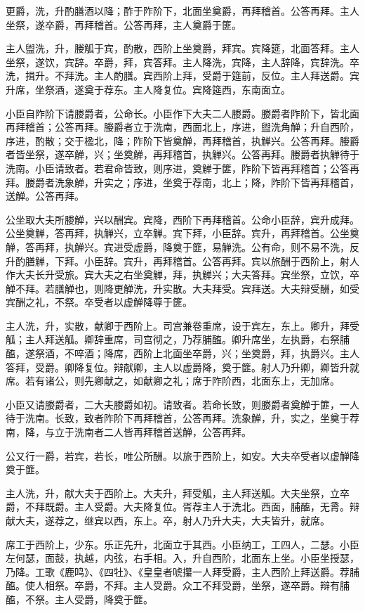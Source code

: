 \documentclass[]{article}
\begin{document}
更爵，洗，升酌膳酒以降；酢于阼阶下，北面坐奠爵，再拜稽首。公答再拜。主人坐祭，遂卒爵，再拜稽首。公答再拜，主人奠爵于篚。

主人盥洗，升，媵觚于宾，酌散，西阶上坐奠爵，拜宾。宾降筵，北面答拜。主人坐祭，遂饮，宾辞。卒爵，拜，宾答拜。主人降洗，宾降，主人辞降，宾辞洗。卒洗，揖升。不拜洗。主人酌膳。宾西阶上拜，受爵于筵前，反位。主人拜送爵。宾升席，坐祭酒，遂奠于荐东。主人降复位。宾降筵西，东南面立。

小臣自阼阶下请媵爵者，公命长。小臣作下大夫二人媵爵。媵爵者阼阶下，皆北面再拜稽首；公答再拜。媵爵者立于洗南，西面北上，序进，盥洗角觯；升自西阶，序进，酌散；交于楹北，降；阼阶下皆奠觯，再拜稽首，执觯兴。公答再拜。媵爵者皆坐祭，遂卒觯，兴；坐奠觯，再拜稽首，执觯兴。公答再拜。媵爵者执觯待于洗南。小臣请致者。若君命皆致，则序进，奠觯于篚，阼阶下皆再拜稽首；公答再拜。媵爵者洗象觯，升实之；序进，坐奠于荐南，北上；降，阼阶下皆再拜稽首，送觯。公答再拜。

公坐取大夫所媵觯，兴以酬宾。宾降，西阶下再拜稽首。公命小臣辞，宾升成拜。公坐奠觯，答再拜，执觯兴，立卒觯。宾下拜，小臣辞。宾升，再拜稽首。公坐奠觯，答再拜，执觯兴。宾进受虚爵，降奠于篚，易觯洗。公有命，则不易不洗，反升酌膳觯，下拜。小臣辞。宾升，再拜稽首。公答再拜。宾以旅酬于西阶上，射人作大夫长升受旅。宾大夫之右坐奠觯，拜，执觯兴；大夫答拜。宾坐祭，立饮，卒觯不拜。若膳觯也，则降更觯洗，升实散。大夫拜受。宾拜送。大夫辩受酬，如受宾酬之礼，不祭。卒受者以虚觯降尊于篚。

主人洗，升，实散，献卿于西阶上。司宫兼卷重席，设于宾左，东上。卿升，拜受觚；主人拜送觚。卿辞重席，司宫彻之，乃荐脯醢。卿升席坐，左执爵，右祭脯醢，遂祭酒，不啐酒；降席，西阶上北面坐卒爵，兴；坐奠爵，拜，执爵兴。主人答拜，受爵。卿降复位。辩献卿，主人以虚爵降，奠于篚。射人乃升卿，卿皆升就席。若有诸公，则先卿献之，如献卿之礼；席于阼阶西，北面东上，无加席。

小臣又请媵爵者，二大夫媵爵如初。请致者。若命长致，则媵爵者奠觯于篚，一人待于洗南。长致，致者阼阶下再拜稽首，公答再拜。洗象觯，升，实之，坐奠于荐南，降，与立于洗南者二人皆再拜稽首送觯，公答再拜。

公又行一爵，若宾，若长，唯公所酬。以旅于西阶上，如安。大夫卒受者以虚觯降奠于篚。

主人洗，升，献大夫于西阶上。大夫升，拜受觚，主人拜送觚。大夫坐祭，立卒爵，不拜既爵。主人受爵。大夫降复位。胥荐主人于洗北。西面，脯醢，无脀。辩献大夫，遂荐之，继宾以西，东上。卒，射人乃升大夫，大夫皆升，就席。

席工于西阶上，少东。乐正先升，北面立于其西。小臣纳工，工四人，二瑟。小臣左何瑟，面鼓，执越，内弦，右手相。入，升自西阶，北面东上坐。小臣坐授瑟，乃降。工歌《鹿鸣》、《四牡》、《皇皇者唬攥一人拜受爵，主人西阶上拜送爵。荐脯醢。使人相祭。卒爵，不拜。主人受爵。众工不拜受爵，坐祭，遂卒爵。辩有脯醢，不祭。主人受爵，降奠于篚。
\end{document}
